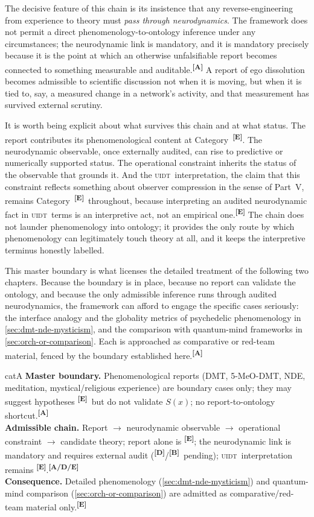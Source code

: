 \documentclass[12pt,a4paper,twoside]{article}
\theoremstyle{plain}
\theoremstyle{definition}
\theoremstyle{remark}
\newcommand{\UIDT}{\textsc{uidt}}
\newcommand{\catmark}[1]{\textsuperscript{\textsf{\textbf{[#1]}}}}
\begin{document}
\noindent The decisive feature of this chain is its insistence that any reverse-engineering from experience to theory must \emph{pass through neurodynamics}. The framework does not permit a direct phenomenology-to-ontology inference under any circumstances; the neurodynamic link is mandatory, and it is mandatory precisely because it is the point at which an otherwise unfalsifiable report becomes connected to something measurable and auditable.\catmark{A} A report of ego dissolution becomes admissible to scientific discussion not when it is moving, but when it is tied to, say, a measured change in a network's activity, and that measurement has survived external scrutiny.

It is worth being explicit about what survives this chain and at what status. The report contributes its phenomenological content at Category~\catmark{E}. The neurodynamic observable, once externally audited, can rise to predictive or numerically supported status. The operational constraint inherits the status of the observable that grounds it. And the \UIDT\ interpretation, the claim that this constraint reflects something about observer compression in the sense of Part~V, remains Category~\catmark{E}\ throughout, because interpreting an audited neurodynamic fact in \UIDT\ terms is an interpretive act, not an empirical one.\catmark{E} The chain does not launder phenomenology into ontology; it provides the only route by which phenomenology can legitimately touch theory at all, and it keeps the interpretive terminus honestly labelled.

This master boundary is what licenses the detailed treatment of the following two chapters. Because the boundary is in place, because no report can validate the ontology, and because the only admissible inference runs through audited neurodynamics, the framework can afford to engage the specific cases seriously: the interface analogy and the globality metrics of psychedelic phenomenology in \cref{sec:dmt-nde-mysticism}, and the comparison with quantum-mind frameworks in \cref{sec:orch-or-comparison}. Each is approached as comparative or red-team material, fenced by the boundary established here.\catmark{A}

\begin{evidencebox}{catA}
\textbf{Master boundary.} Phenomenological reports (DMT, 5-MeO-DMT, NDE, meditation, mystical/religious experience) are boundary cases only; they may suggest hypotheses \catmark{E}\ but do not validate $S(x)$; no report-to-ontology
shortcut.\catmark{A}\\[0.3em]
\textbf{Admissible chain.} Report $\to$ neurodynamic observable $\to$ operational constraint $\to$ candidate theory; report alone is \catmark{E}; the neurodynamic link is mandatory and requires external audit (\catmark{D}/\catmark{B}\ pending);
\UIDT\ interpretation remains \catmark{E}.\catmark{A/D/E}\\[0.3em]
\textbf{Consequence.} Detailed phenomenology (\cref{sec:dmt-nde-mysticism}) and quantum-mind comparison (\cref{sec:orch-or-comparison}) are admitted as comparative/red-team material only.\catmark{E}
\end{evidencebox}
\end{document}
